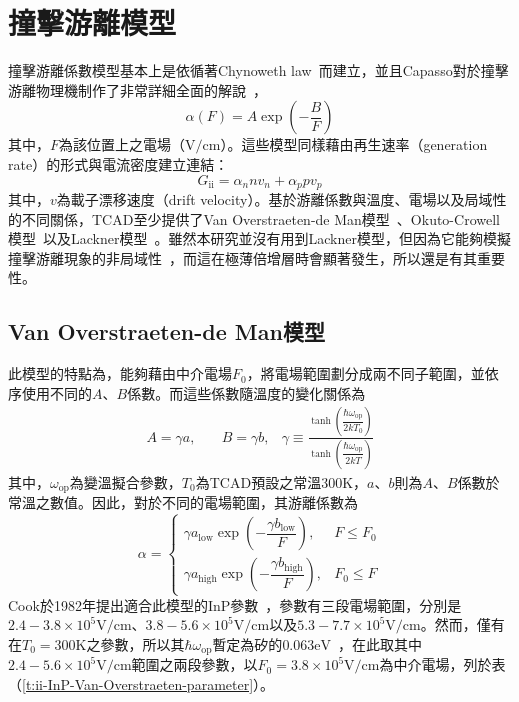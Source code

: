 \section{撞擊游離模型}
撞擊游離係數模型基本上是依循著Chynoweth law~\cite{chynoweth1958ionization}而建立，並且Capasso對於撞擊游離物理機制作了非常詳細全面的解說~\cite{capasso1985physics}，
\begin{equation}
\alpha(F)=A\exp\left(-\frac{B}{F}\right)
\end{equation}
其中，$F$為該位置上之電場（$\mathrm{V}/\mathrm{cm}$）。這些模型同樣藉由再生速率（generation rate）的形式與電流密度建立連結：
\begin{equation}
G_\text{ii}=\alpha_n nv_n+\alpha_p pv_p
\end{equation}
其中，$v$為載子漂移速度（drift velocity）。基於游離係數與溫度、電場以及局域性的不同關係，TCAD至少提供了Van Overstraeten-de Man模型~\cite{van1970measurement}、Okuto-Crowell模型~\cite{okuto1975threshold}以及Lackner模型~\cite{lackner1991avalanche}。雖然本研究並沒有用到Lackner模型，但因為它能夠模擬撞擊游離現象的非局域性~\cite{lackner1991avalanche}\cite{okuto1974ionization}\cite{spinelli1996dead}\cite{mcintyre1999new}，而這在極薄倍增層時會顯著發生，所以還是有其重要性。
\subsection{Van Overstraeten-de Man模型}
此模型的特點為，能夠藉由中介電場$F_0$，將電場範圍劃分成兩不同子範圍，並依序使用不同的$A$、$B$係數。而這些係數隨溫度的變化關係為
\begin{equation}
\begin{aligned}
A=\gamma a,\quad&B=\gamma b,&\gamma\equiv\frac{\tanh\left(\dfrac{\hbar\omega_\text{op}}{2kT_0}\right)}{\tanh\left(\dfrac{\hbar\omega_\text{op}}{2kT}\right)}
\end{aligned}
\end{equation}
其中，$\omega_\text{op}$為變溫擬合參數，$T_0$為TCAD預設之常溫$300\left.\mathrm{K}\right.$，$a$、$b$則為$A$、$B$係數於常溫之數值。因此，對於不同的電場範圍，其游離係數為
\begin{equation}
\alpha=
\begin{cases}
\gamma a_\text{low}\exp\left(-\dfrac{\gamma b_\text{low}}{F}\right),&F\leq F_0\\[15pt]
\gamma a_\text{high}\exp\left(-\dfrac{\gamma b_\text{high}}{F}\right),&F_0\leq F
\end{cases}
\end{equation}
\hspace{2em}Cook於1982年提出適合此模型的InP參數~\cite{cook1982electron}，參數有三段電場範圍，分別是$2.4-3.8\times10^5\left.\mathrm{V}/\mathrm{cm}\right.$、$3.8-5.6\times10^5\left.\mathrm{V}/\mathrm{cm}\right.$以及$5.3-7.7\times10^5\left.\mathrm{V}/\mathrm{cm}\right.$。然而，\cite{cook1982electron}僅有在$T_0=300\left.\mathrm{K}\right.$之參數，所以其$\hbar\omega_\text{op}$暫定為矽的$0.063\left.\mathrm{eV}\right.$~\cite{van1970measurement}，在此取其中$2.4-5.6\times10^5\left.\mathrm{V}/\mathrm{cm}\right.$範圍之兩段參數，以$F_0=3.8\times10^5\left.\mathrm{V}/\mathrm{cm}\right.$為中介電場，列於表（\ref{t:ii-InP-Van-Overstraeten-parameter}）。

